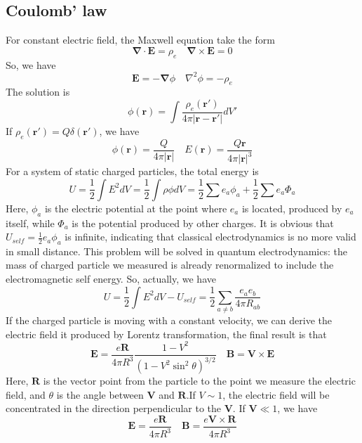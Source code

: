 \documentclass[cyan]{elegantnote}
\begin{document}
\subsection{Coulomb' law}
For constant electric field, the Maxwell equation take the form 
\[\bm{\nabla} \cdot \bm{E} = \rho_e \quad \bm{\nabla} \times \bm{E} = 0\]
So, we have
\[\bm{E} = -\bm{\nabla} \phi \quad \nabla^2 \phi = -\rho_e \]
The solution is
\[\phi(\bm{r}) = \int  \frac{\rho_e(\bm{r}')}{4\pi|\bm{r}-\bm{r}'|} dV'\]
If $\rho_e(\bm{r}') = Q \delta(\bm{r}')$, we have
\[\phi(\bm{r}) =  \frac{Q}{4\pi|\bm{r}|} \quad E(\bm{r}) = \frac{Q\bm{r}}{4\pi|\bm{r}|^3}\]
For a system of static charged particles, the total energy is
\[U = \frac{1}{2}\int E^2 dV = \frac{1}{2} \int \rho \phi dV = \frac{1}{2} \sum e_a \phi_a + \frac{1}{2}\sum e_a \Phi_a\]
Here, $\phi_a$ is the electric potential at the point where $e_a$ is located, produced by $e_a$ itself, while  $\Phi_a$ is the potential produced by other charges. It is obvious that $U_{self} = \frac{1}{2} e_a \phi_a$ is infinite, indicating that classical electrodynamics is no more valid in small distance. This problem will be solved in quantum electrodynamics: the mass of charged particle we measured is already renormalized to include the electromagnetic self energy. So, actually, we have
\[U = \frac{1}{2}\int E^2 dV - U_{self} = \frac{1}{2}\sum_{a \ne b} \frac{e_a e_b}{4\pi R_{ab}}\]
If the charged particle is moving with a constant velocity, we can derive the electric field it produced by Lorentz transformation, the final result is that
\[\bm{E} = \frac{e\bm{R}}{4\pi R^3} \frac{1-V^2}{(1-V^2\sin^2\theta)^{3/2}} \quad \bm{B} = \bm{V} \times \bm{E}\]
Here, $\bm{R}$ is the vector point from the particle to the point we measure the electric field, and $\theta$ is the angle between $\bm{V}$ and $\bm{R}$.If $V \sim 1$, the electric field will be concentrated in the direction perpendicular to the $\bm{V}$. If $\bm{V} \ll 1$, we have
\[\bm{E} = \frac{e\bm{R}}{4\pi R^3} \quad \bm{B} = \frac{e\bm{V} \times\bm{R}}{4\pi R^3}\]
\end{document}
